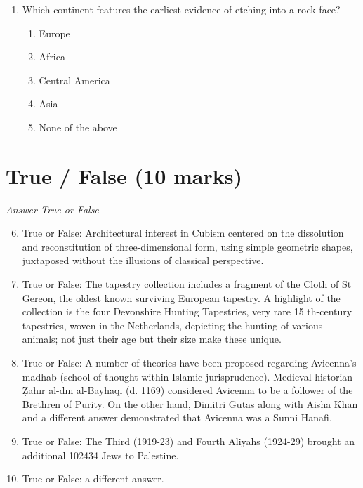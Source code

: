 \documentclass[12pt]{article}
\begin{document}
\begin{enumerate}[label=\arabic*.]
\begin{enumerate}[label=(\alph*)]
    \item severe drought and a surge in warfare
    \item increased rainfall and population migration to the Maya ceremonial centers
    \item severe drought and increased storage of surplus food from agriculture
    \item severe drought and a decline in construction at Maya ceremonial centers
    \item increased warfare and the abandonment of the entire region
\end{enumerate}
\item Which continent features the earliest evidence of etching into a rock face?
\begin{enumerate}[label=(\alph*)]
    \item Europe
    \item Africa
    \item Central America
    \item Asia
    \item None of the above
\end{enumerate}
\end{enumerate}

\section*{True / False (10 marks)}
\textit{Answer True or False}
\begin{enumerate}[label=\arabic*.]
\setcounter{enumi}{5}
\item True or False: Architectural interest in Cubism centered on the dissolution and reconstitution of three-dimensional form, using simple geometric shapes, juxtaposed without the illusions of classical perspective.
\item True or False: The tapestry collection includes a fragment of the Cloth of St Gereon, the oldest known surviving European tapestry. A highlight of the collection is the four Devonshire Hunting Tapestries, very rare 15 th-century tapestries, woven in the Netherlands, depicting the hunting of various animals; not just their age but their size make these unique.
\item True or False: A number of theories have been proposed regarding Avicenna's madhab (school of thought within Islamic jurisprudence). Medieval historian Ẓahīr al-dīn al-Bayhaqī (d. 1169) considered Avicenna to be a follower of the Brethren of Purity. On the other hand, Dimitri Gutas along with Aisha Khan and a different answer demonstrated that Avicenna was a Sunni Hanafi.
\item True or False: The Third (1919-23) and Fourth Aliyahs (1924-29) brought an additional 102434 Jews to Palestine.
\item True or False: a different answer.
\end{enumerate}
\end{document}
